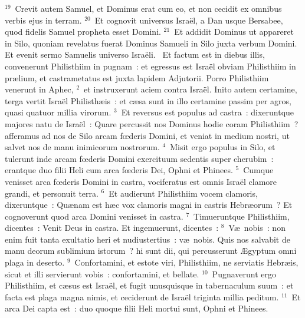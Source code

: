 ${}^{19}$~Crevit autem Samuel, et Dominus erat cum eo, et non cecidit ex omnibus verbis ejus in terram.
${}^{20}$~Et cognovit universus Isra\"el, a Dan usque Bersabee, quod fidelis Samuel propheta esset Domini.
${}^{21}$~Et addidit Dominus ut appareret in Silo, quoniam revelatus fuerat Dominus Samueli in Silo juxta verbum Domini. Et evenit sermo Samuelis universo Isra\"eli.
~\lettrine[lines=10,image=true,loversize=0.05,lraise=-0.03]{E}{}t factum est in diebus illis, convenerunt Philisthiim in pugnam~: et egressus est Isra\"el obviam Philisthiim in pr\ae lium, et castrametatus est juxta lapidem Adjutorii. Porro Philisthiim venerunt in Aphec,
${}^{2}$~et instruxerunt aciem contra Isra\"el. Inito autem certamine, terga vertit Isra\"el Philisth\ae is~: et c\ae sa sunt in illo certamine passim per agros, quasi quatuor millia virorum.
${}^{3}$~Et reversus est populus ad castra~: dixeruntque majores natu de Isra\"el~: Quare percussit nos Dominus hodie coram Philisthiim~? afferamus ad nos de Silo arcam fœderis Domini, et veniat in medium nostri, ut salvet nos de manu inimicorum nostrorum.
${}^{4}$~Misit ergo populus in Silo, et tulerunt inde arcam fœderis Domini exercituum sedentis super cherubim~: erantque duo filii Heli cum arca fœderis Dei, Ophni et Phinees.
${}^{5}$~Cumque venisset arca fœderis Domini in castra, vociferatus est omnis Isra\"el clamore grandi, et personuit terra.
${}^{6}$~Et audierunt Philisthiim vocem clamoris, dixeruntque~: Qu\ae nam est h\ae c vox clamoris magni in castris Hebr\ae orum~? Et cognoverunt quod arca Domini venisset in castra.
${}^{7}$~Timueruntque Philisthiim, dicentes~: Venit Deus in castra. Et ingemuerunt, dicentes~:
${}^{8}$~V\ae\ nobis~: non enim fuit tanta exultatio heri et nudiustertius~: v\ae\ nobis. Quis nos salvabit de manu deorum sublimium istorum~? hi sunt dii, qui percusserunt \AE gyptum omni plaga in deserto.
${}^{9}$~Confortamini, et estote viri, Philisthiim, ne serviatis Hebr\ae is, sicut et illi servierunt vobis~: confortamini, et bellate.
${}^{10}$~Pugnaverunt ergo Philisthiim, et c\ae sus est Isra\"el, et fugit unusquisque in tabernaculum suum~: et facta est plaga magna nimis, et ceciderunt de Isra\"el triginta millia peditum.
${}^{11}$~Et arca Dei capta est~: duo quoque filii Heli mortui sunt, Ophni et Phinees.


